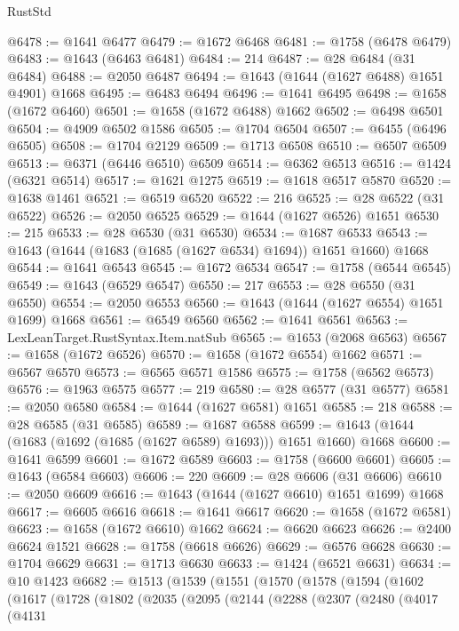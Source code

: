 \begin{lexlean}{RustStd}
\begin{coremodule}
@6478 := @1641 @6477
@6479 := @1672 @6468
@6481 := @1758 (@6478 @6479)
@6483 := @1643 (@6463 @6481)
@6484 := 214
@6487 := @28 @6484 (@31 @6484)
@6488 := @2050 @6487
@6494 := @1643 (@1644 (@1627 @6488) @1651 @4901) @1668
@6495 := @6483 @6494
@6496 := @1641 @6495
@6498 := @1658 (@1672 @6460)
@6501 := @1658 (@1672 @6488) @1662
@6502 := @6498 @6501
@6504 := @4909 @6502 @1586
@6505 := @1704 @6504
@6507 := @6455 (@6496 @6505)
@6508 := @1704 @2129
@6509 := @1713 @6508
@6510 := @6507 @6509
@6513 := @6371 (@6446 @6510) @6509
@6514 := @6362 @6513
@6516 := @1424 (@6321 @6514)
@6517 := @1621 @1275
@6519 := @1618 @6517 @5870
@6520 := @1638 @1461
@6521 := @6519 @6520
@6522 := 216
@6525 := @28 @6522 (@31 @6522)
@6526 := @2050 @6525
@6529 := @1644 (@1627 @6526) @1651
@6530 := 215
@6533 := @28 @6530 (@31 @6530)
@6534 := @1687 @6533
@6543 := @1643 (@1644 (@1683 (@1685 (@1627 @6534) @1694)) @1651 @1660) @1668
@6544 := @1641 @6543
@6545 := @1672 @6534
@6547 := @1758 (@6544 @6545)
@6549 := @1643 (@6529 @6547)
@6550 := 217
@6553 := @28 @6550 (@31 @6550)
@6554 := @2050 @6553
@6560 := @1643 (@1644 (@1627 @6554) @1651 @1699) @1668
@6561 := @6549 @6560
@6562 := @1641 @6561
@6563 := LexLeanTarget.RustSyntax.Item.natSub
@6565 := @1653 (@2068 @6563)
@6567 := @1658 (@1672 @6526)
@6570 := @1658 (@1672 @6554) @1662
@6571 := @6567 @6570
@6573 := @6565 @6571 @1586
@6575 := @1758 (@6562 @6573)
@6576 := @1963 @6575
@6577 := 219
@6580 := @28 @6577 (@31 @6577)
@6581 := @2050 @6580
@6584 := @1644 (@1627 @6581) @1651
@6585 := 218
@6588 := @28 @6585 (@31 @6585)
@6589 := @1687 @6588
@6599 := @1643 (@1644 (@1683 (@1692 (@1685 (@1627 @6589) @1693))) @1651 @1660) @1668
@6600 := @1641 @6599
@6601 := @1672 @6589
@6603 := @1758 (@6600 @6601)
@6605 := @1643 (@6584 @6603)
@6606 := 220
@6609 := @28 @6606 (@31 @6606)
@6610 := @2050 @6609
@6616 := @1643 (@1644 (@1627 @6610) @1651 @1699) @1668
@6617 := @6605 @6616
@6618 := @1641 @6617
@6620 := @1658 (@1672 @6581)
@6623 := @1658 (@1672 @6610) @1662
@6624 := @6620 @6623
@6626 := @2400 @6624 @1521
@6628 := @1758 (@6618 @6626)
@6629 := @6576 @6628
@6630 := @1704 @6629
@6631 := @1713 @6630
@6633 := @1424 (@6521 @6631)
@6634 := @10 @1423
@6682 := @1513
    (@1539
      (@1551
        (@1570
          (@1578
            (@1594
              (@1602
                (@1617
                  (@1728
                    (@1802
                      (@2035
                        (@2095
                          (@2144
                            (@2288
                              (@2307
                                (@2480
                                  (@4017
                                    (@4131

\end{coremodule}
\end{lexlean}
